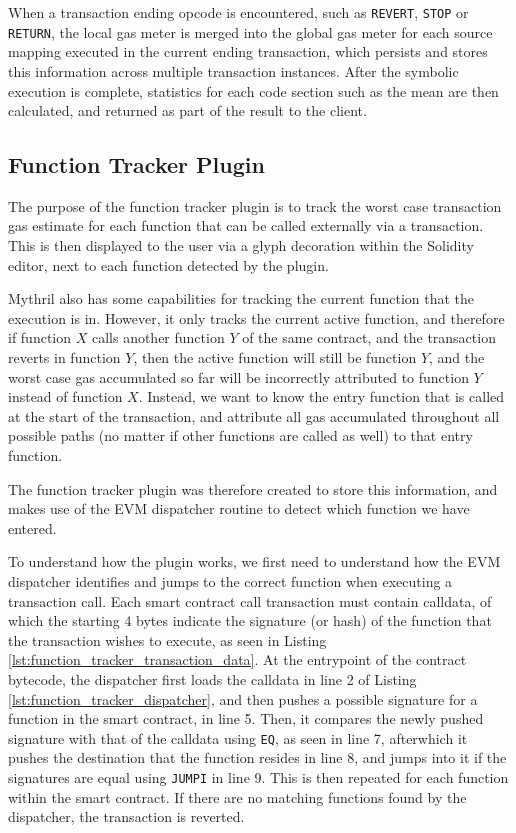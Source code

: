When a transaction ending opcode is encountered, such as \texttt{REVERT}, \texttt{STOP} or \texttt{RETURN},
the local gas meter is merged into the global gas meter for each source mapping executed in the 
current ending transaction, which persists and stores this information across multiple transaction 
instances. After the symbolic execution is complete, statistics for each code section such as the mean are 
then calculated, and returned as part of the result to the client.


\subsection{Function Tracker Plugin}

The purpose of the function tracker plugin is to track the worst case transaction gas 
estimate for each function that can be called externally via a transaction. This is then
displayed to the user via a glyph decoration within the Solidity editor, 
next to each function detected by the plugin.

Mythril also has some capabilities for tracking the current function that the execution is in.
However, it only tracks the current active function, and therefore if function $X$ calls another
function $Y$ of the same contract, and the transaction reverts in function $Y$, then the active function
will still be function $Y$, and the worst case gas accumulated so far will be incorrectly attributed
to function $Y$ instead of function $X$. Instead, we want to know the entry function that is called
at the start of the transaction, and attribute all gas accumulated throughout all possible paths (no matter
if other functions are called as well) to that entry function.

The function tracker plugin was therefore created to store this information, and makes
use of the EVM dispatcher routine to detect which function we have entered.

To understand how the plugin works, we first need to understand how the EVM dispatcher identifies and jumps 
to the correct function when executing a transaction call. Each smart contract call transaction 
must contain calldata, of which the starting 4 bytes indicate the signature (or hash) of the function
that the transaction wishes to execute, as seen in Listing \ref{lst:function_tracker_transaction_data}. 
At the entrypoint of the contract bytecode, the dispatcher first loads the calldata in line
2 of Listing \ref{lst:function_tracker_dispatcher}, and then pushes a possible signature for a function in the smart contract,
in line 5. Then, it compares the newly pushed signature with that of the calldata using \texttt{EQ}, 
as seen in line 7, afterwhich it pushes the destination that the function resides in line 8, and 
jumps into it if the signatures are equal using \texttt{JUMPI} in line 9. This is then repeated 
for each function within the smart contract. If there are no matching functions found 
by the dispatcher, the transaction is reverted.

